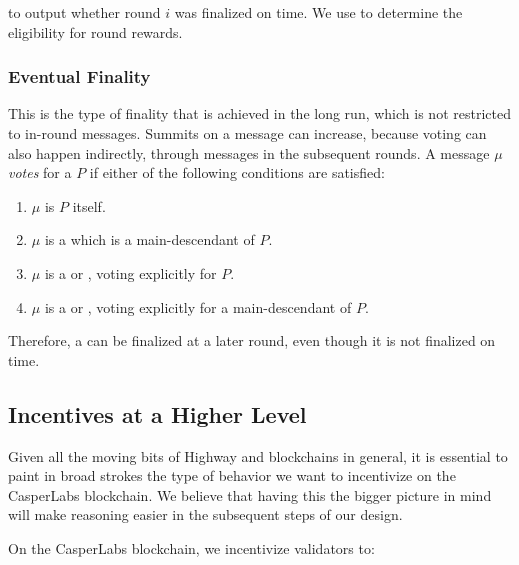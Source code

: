 to output whether round $i$ was finalized on time. We use to determine the eligibility for round rewards.

\subsubsection*{Eventual Finality}
\label{sec:eventual-finality}

This is the type of finality that is achieved in the long run, which is not restricted to in-round messages. Summits on a message can increase, because voting can also happen indirectly, through messages in the subsequent rounds. A message $\mu$ \emph{votes} for a \PROP $P$ if either of the following conditions are satisfied:

\begin{enumerate}
\def\labelenumi{\arabic{enumi}.}
\item $\mu$ is $P$ itself.
\item $\mu$ is a \PROP which is a main-descendant of $P$.
\item $\mu$ is a \CONF or \WIT, voting explicitly for $P$.
\item $\mu$ is a \CONF or \WIT, voting explicitly for a main-descendant of $P$.
\end{enumerate}

Therefore, a \PROP can be finalized at a later round, even though it is not finalized on time.

\subsection{Incentives at a Higher Level}

Given all the moving bits of Highway and blockchains in general, it is essential to paint in broad strokes the type of behavior we want to incentivize on the CasperLabs blockchain. We believe that having this the bigger picture in mind will make reasoning easier in the subsequent steps of our design.

On the CasperLabs blockchain, we incentivize validators to:

